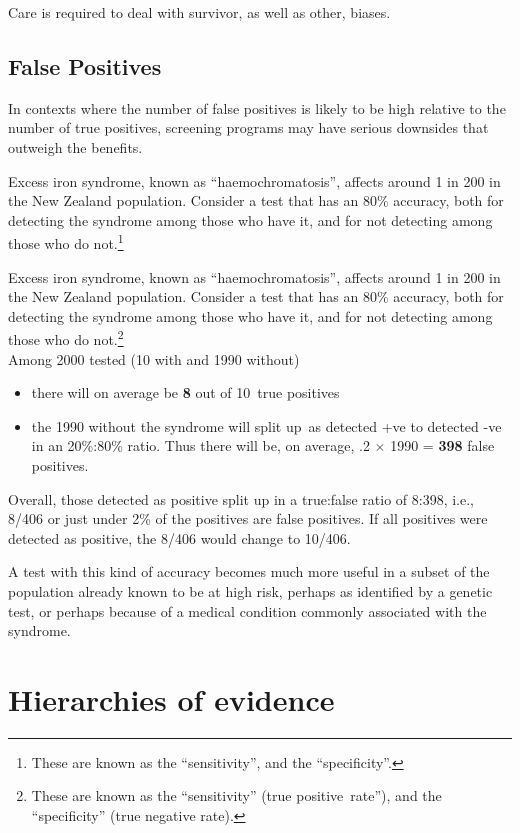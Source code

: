\documentclass[
  10ptls,
  b5paper]{book}
\providecommand{\tightlist}{%
  \setlength{\itemsep}{0pt}\setlength{\parskip}{0pt}}
\begin{document}
Care is required to deal with survivor, as well as other, biases.

\subsection{False Positives}\label{false-positives}

In contexts where the number of false positives is likely to be high relative to the number of true positives, screening programs may have serious downsides that outweigh the benefits.

Excess iron syndrome, known as ``haemochromatosis'', affects around 1 in 200 in the New Zealand population. Consider a test that has an 80\% accuracy, both for detecting the syndrome among those who have it, and for not detecting among those who do not.\footnote{These are known as the ``sensitivity'', and the ``specificity''.}

Excess iron syndrome, known as ``haemochromatosis'', affects around 1 in 200 in the New Zealand population. Consider a test that has an 80\% accuracy, both for detecting the syndrome among those who have it, and for not detecting among those who do not.\footnote{These are known as the ``sensitivity'' (true positive~rate''), and the ``specificity'' (true negative rate).}\\
Among 2000 tested (10 with and 1990 without)

\begin{itemize}
\tightlist
\item
  there will on average be \textbf{8} out of 10~true positives
\item
  the 1990 without the syndrome will split up~as detected +ve to detected -ve in an 20\%:80\% ratio. Thus there will be, on average, .2 \(\times\) 1990 = \textbf{398} false positives.
\end{itemize}

Overall, those detected as positive split up in a true:false ratio of 8:398, i.e., 8/406 or just under 2\% of the positives are false positives. If all positives were detected as positive, the 8/406 would change to 10/406.

A test with this kind of accuracy becomes much more useful in a subset of the population already known to be at high risk, perhaps as identified by a genetic test, or perhaps because of a medical condition commonly associated with the syndrome.

\section{Hierarchies of evidence}\label{hierarchies-of-evidence}
\end{document}
